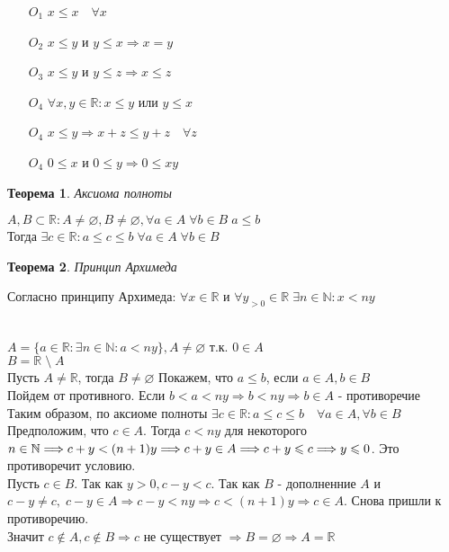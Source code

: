 \documentclass[12pt,letterpaper]{report}
\makeatletter
\newtheorem*{theorem-non}{Теорема}
\renewenvironment{proof}[1][\proofname]{%
   \par\pushQED{\qed}\normalfont%
   \topsep6\p@\@plus6\p@\relax
   \trivlist\item[\hskip\labelsep\bfseries#1\@addpunct{.}]%
   \ignorespaces
}{%
   \popQED\endtrivlist\@endpefalse
}
\makeatother
\begin{document}
\begin{itemize}
    \item[$O_1$] $x \leqslant x \quad \forall x$
    \item[$O_2$] $x \leqslant y $  и  $ y \leqslant x \Longrightarrow x = y$ 
    \item[$O_3$] $x \leqslant y $  и  $ y \leqslant z \Longrightarrow x \leqslant z$ 
    \item[$O_4$] $\forall x, y \in \mathbb{R} : x \leqslant y $ или $ y \leqslant x$
    \item[$O_4$] $x \leqslant y \Longrightarrow x + z \leqslant y + z \quad \forall z$ 
    \item[$O_4$] $0 \leqslant x $ и $ 0 \leqslant y \Longrightarrow 0 \leqslant xy$  
\end{itemize}
\begin{theorem-non}
    Аксиома полноты
\end{theorem-non}
$A, B \subset \mathbb{R} : A \neq \varnothing, B \neq \varnothing, \forall a \in A \; \forall b \in B \; a \leqslant b$ \\
Тогда $\exists c \in \mathbb{R} : a \leqslant c \leqslant b \; \forall a \in A \; \forall b \in B$
\begin{theorem-non}
    Принцип Архимеда
\end{theorem-non}
Согласно принципу Архимеда: $\forall x \in \mathbb{R}$ и $\forall y_{>0} \in \mathbb{R} \; \exists n \in \mathbb{N} : x < ny$
\begin{proof}  
    \quad \\ $A = \{a \in \mathbb{R} : \exists n \in \mathbb{N} : a < ny\}, A \neq \varnothing$ т.к. $0 \in A$ \\
    $B = \mathbb{R} \; \setminus \; A$ \\
    Пусть $A \neq \mathbb{R}$, тогда $B \neq \varnothing$ Покажем, что $a \leqslant b$, если $a \in A, b \in B$ \\
    Пойдем от противного. Если $b < a < ny \Longrightarrow b < ny \Longrightarrow b \in A$ - противоречие \\
    Таким образом, по аксиоме полноты $\exists c \in \mathbb{R} : a \leqslant c \leqslant b \quad \forall a \in A, \forall b \in B$ \\
    Предположим, что $c \in A$. Тогда $c < ny$ для некоторого $n \in \mathbb{N} \Longrightarrow c + y < (n + 1)y \Longrightarrow \\ 
    c + y \in A \Longrightarrow c + y \leqslant c \Longrightarrow y \leqslant 0$. Это противоречит условию. \\
    Пусть $c \in B$. Так как $y > 0, c - y < c$. Так как $B$ - дополненние $A$ и $c - y \neq c, \; c - y \in A
    \Longrightarrow c - y < ny \Longrightarrow c < (n + 1)y \Longrightarrow c \in A$. Снова пришли к противоречию. \\
    Значит $c \notin A, c \notin B \Longrightarrow c$ не существует $\Longrightarrow B = \varnothing \Longrightarrow A = \mathbb{R}$ 
\end{proof}
\end{document}
